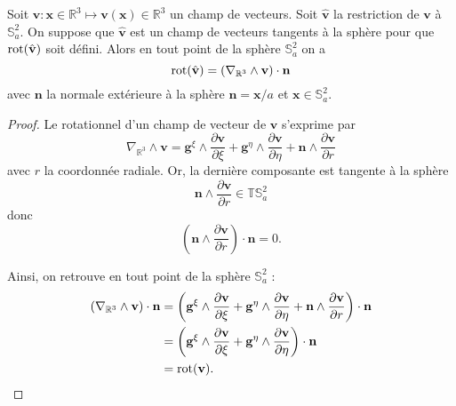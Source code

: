 \begin{proposition}
Soit $\mathbf{v} : \mathbf{x} \in \mathbb{R}^3 \mapsto \mathbf{v}(\mathbf{x}) \in \mathbb{R}^3$ un champ de vecteurs. Soit $\hat{\mathbf{v}}$ la restriction de $\mathbf{v}$ à $\mathbb{S}_a^2$. On suppose que $\hat{\mathbf{v}}$ est un champ de vecteurs tangents à la sphère pour que $\text{rot}(\hat{\mathbf{v}})$ soit défini. Alors en tout point de la sphère $\mathbb{S}_a^2$ on a
\begin{equation}
\text{rot} (\hat{\mathbf{v}} ) = \left( \nabla_{\mathbb{R}^3} \wedge \mathbf{v} \right) \cdot \mathbf{n}
\end{equation}
avec $\mathbf{n}$ la normale extérieure à la sphère $\mathbf{n} = \mathbf{x}/a$ et $\mathbf{x} \in \mathbb{S}_a^2$.
\end{proposition}

\begin{proof}
Le rotationnel d'un champ de vecteur de $\mathbf{v}$ s'exprime par
\begin{equation}
\nabla_{\mathbb{R}^3} \wedge \mathbf{v} = \mathbf{g}^{\xi} \wedge \dfrac{\partial \mathbf{v}}{\partial \xi} + \mathbf{g}^{\eta} \wedge \dfrac{\partial \mathbf{v}}{\partial \eta} + \mathbf{n}\wedge \dfrac{\partial \mathbf{v}}{\partial r}
\end{equation}
avec $r$ la coordonnée radiale. 
Or, la dernière composante est tangente à la sphère
\begin{equation}
\mathbf{n}\wedge \dfrac{\partial \mathbf{v}}{\partial r} \in \mathbb{T}\mathbb{S}_a^2
\end{equation}
donc
\begin{equation}
\left(  \mathbf{n}\wedge \dfrac{\partial \mathbf{v}}{\partial r} \right) \cdot \mathbf{n} = 0.
\end{equation}

Ainsi, on retrouve en tout point de la sphère $\mathbb{S}_a^2$ :
\begin{align}
\left(  \nabla_{\mathbb{R}^3} \wedge \mathbf{v} \right) \cdot \mathbf{n} & = \left(  \mathbf{g}^{\xi} \wedge \dfrac{\partial \mathbf{v}}{\partial \xi} + \mathbf{g}^{\eta} \wedge \dfrac{\partial \mathbf{v}}{\partial \eta} + \mathbf{n}\wedge \dfrac{\partial \mathbf{v}}{\partial r} \right) \cdot \mathbf{n} \\
& = \left(  \mathbf{g}^{\xi} \wedge \dfrac{\partial \mathbf{v}}{\partial \xi} + \mathbf{g}^{\eta} \wedge \dfrac{\partial \mathbf{v}}{\partial \eta} \right) \cdot \mathbf{n} \\
& = \text{rot} ( \mathbf{v} ).
\end{align}
\end{proof}

